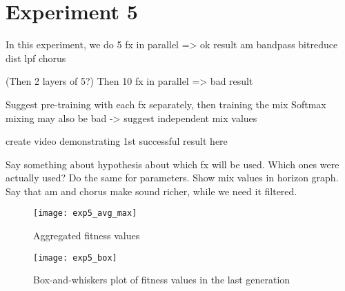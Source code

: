 \section{Experiment 5}
In this experiment, we do 5 fx in parallel => ok result
am
bandpass
bitreduce
dist lpf
chorus

(Then 2 layers of 5?)
Then 10 fx in parallel => bad result

Suggest pre-training with each fx separately, then training the mix
Softmax mixing may also be bad -> suggest independent mix values

create video demonstrating 1st successful result here

Say something about hypothesis about which fx will be used. Which ones were actually used? Do the same for parameters. Show mix values in horizon graph. Say that am and chorus make sound richer, while we need it filtered.

\begin{figure}[h]
    \centering
    \texttt{[image: exp5\_avg\_max]}
    \caption{Aggregated fitness values}
    \label{fig:exp5_avg_max}
\end{figure}

\begin{figure}[h]
    \centering
    \texttt{[image: exp5\_box]}
    \caption{Box-and-whiskers plot of fitness values in the last generation}
    \label{fig:exp5_box}
\end{figure}